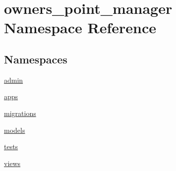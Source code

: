 \hypertarget{namespaceowners__point__manager}{\section{owners\-\_\-point\-\_\-manager Namespace Reference}
\label{namespaceowners__point__manager}
}
\subsection*{Namespaces}
\begin{DoxyCompactItemize}
\item 
\hyperlink{namespaceowners__point__manager_1_1admin}{admin}
\item 
\hyperlink{namespaceowners__point__manager_1_1apps}{apps}
\item 
\hyperlink{namespaceowners__point__manager_1_1migrations}{migrations}
\item 
\hyperlink{namespaceowners__point__manager_1_1models}{models}
\item 
\hyperlink{namespaceowners__point__manager_1_1tests}{tests}
\item 
\hyperlink{namespaceowners__point__manager_1_1views}{views}
\end{DoxyCompactItemize}

